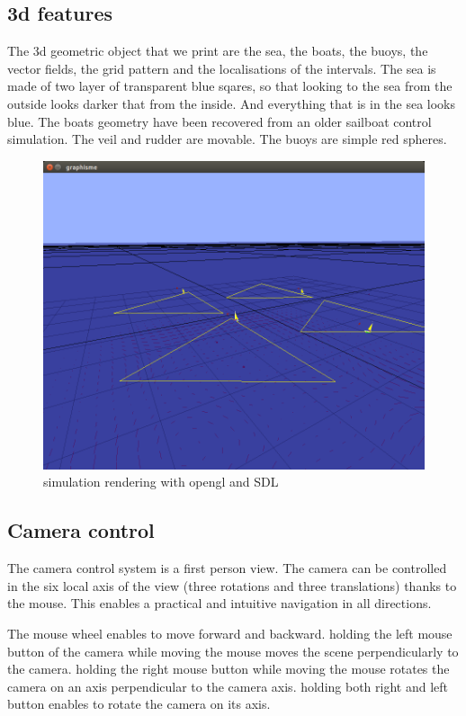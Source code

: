 \documentclass[a4paper]{report}
\begin{document}
\subsection{3d features}

The 3d geometric object that we print are the sea, the boats, the buoys, the vector fields, the grid pattern and the localisations of the intervals. The sea is made of two layer of transparent blue sqares, so that looking to the sea from the outside looks darker that from the inside. And everything that is in the sea looks blue. The boats geometry have been recovered from an older sailboat control simulation. The veil and rudder are movable. The buoys are simple red spheres.

\begin{figure}[H]
	\centering
    \includegraphics[scale=0.4]{image/shepherd_opengl.png}
    \caption{simulation rendering with opengl and SDL}
\end{figure}


\subsection{Camera control}

The camera control system is a first person view. The camera can be controlled in the six local axis of the view (three rotations and three translations) thanks to the mouse. This enables a practical and intuitive navigation in all directions.

The mouse wheel enables to move forward and backward. holding the left mouse button of the camera while moving the mouse moves the scene perpendicularly to the camera. holding the right mouse button while moving the mouse rotates the camera on an axis perpendicular to the camera axis. holding both right and left button enables to rotate the camera on its axis.
\end{document}
